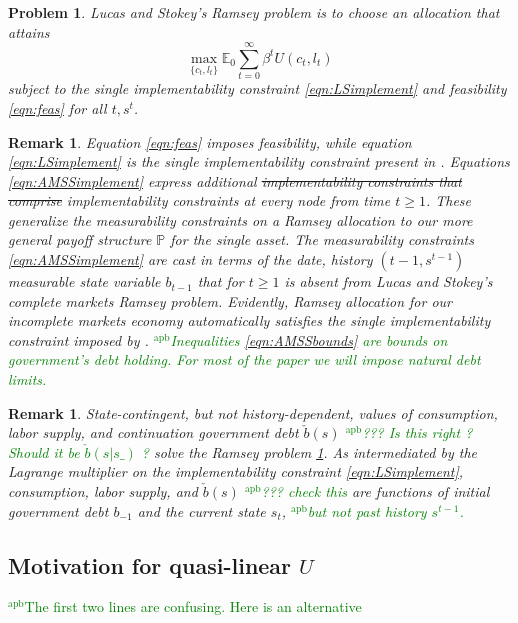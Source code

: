 \documentclass[12pt]{article}
\newcommand{\apb}[1]{\textcolor{green}{$^{\textrm{apb}}${#1}}}
\newcommand{\EE}{\mathbb E}
\newtheorem{remark}[theorem]{Remark}
\newtheorem{problem}[theorem]{Problem}
\begin{document}
\begin{problem}\label{prob:RamseyLS}
Lucas and Stokey's Ramsey problem is to choose an allocation %
that attains %
\begin{equation}\label{eqn:RamseyobjLS}
\max_{\{c_t,l_t\}} \EE_0\sum_{t=0}^\infty \beta^t U(c_t,l_t)
 \end{equation}
 subject to the single implementability constraint \eqref{eqn:LSimplement} and feasibility \eqref{eqn:feas} for all $t, s^t$.
\end{problem}

\begin{remark} Equation \eqref{eqn:feas} imposes feasibility, while equation  \eqref{eqn:LSimplement} is the single implementability constraint
present in \citet{LucasJr.1983}.  Equations \eqref{eqn:AMSSimplement} express  additional \st{implementability constraints that comprise} implementability constraints at every node from time $t \geq 1$. These generalize the \citet{Aiyagari2002} measurability constraints on a Ramsey allocation  to our more general payoff structure ${\mathbb P}$ for the
single asset. The measurability constraints \eqref{eqn:AMSSimplement}  are cast
in terms of the date, history $(t-1, s^{t-1})$ measurable state variable $b_{t-1}$ that for $t \geq 1$ is absent from Lucas and Stokey's complete markets Ramsey problem.  Evidently, Ramsey allocation for our incomplete markets economy automatically satisfies the single implementability constraint imposed by \citeauthor{LucasJr.1983}. \apb{Inequalities \eqref{eqn:AMSSbounds} are bounds on government's debt holding. For most of the paper we will impose natural debt limits.} 
\end{remark}


\begin{remark}\label{rem:LSdebt}
State-contingent, but not history-dependent,  values of consumption, labor supply, and continuation government debt $\check b(s)$ \apb{??? Is this right ? Should it be $\check{b}(s|s\_)$ ?} solve the \citet{LucasJr.1983} Ramsey problem \ref{prob:RamseyLS}.  As intermediated by the Lagrange multiplier on the implementability constraint \eqref{eqn:LSimplement},
consumption, labor supply, and $\check b(s)$ \apb{??? check this } are  functions of initial government debt $b_{-1}$ and the current state $s_t$, \apb{but not past history
 $s^{t-1}$.}
\end{remark}

\subsection{Motivation for  quasi-linear $U$\label{sec:excusequasilinear}}
\apb{The first two lines are confusing. Here is an alternative }
\end{document}
